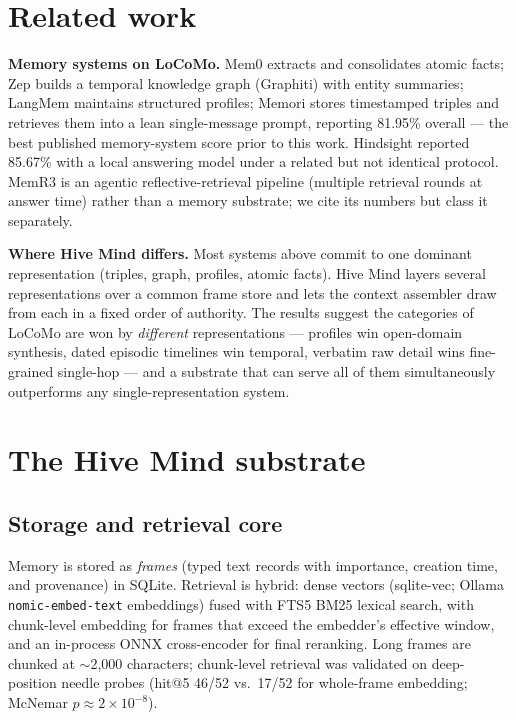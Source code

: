 \documentclass[11pt]{article}
\newcommand{\system}{Hive Mind}
\begin{document}
\section{Related work}

\textbf{Memory systems on LoCoMo.} Mem0 \cite{mem0} extracts and
consolidates atomic facts; Zep \cite{zep} builds a temporal knowledge
graph (Graphiti) with entity summaries; LangMem maintains structured
profiles; Memori \cite{memori} stores timestamped triples and
retrieves them into a lean single-message prompt, reporting 81.95\%
overall --- the best published memory-system score prior to this work.
Hindsight \cite{hindsight} reported 85.67\% with a local answering
model under a related but not identical protocol. MemR3 \cite{memr3}
is an agentic reflective-retrieval pipeline (multiple retrieval rounds
at answer time) rather than a memory substrate; we cite its numbers
but class it separately.

\textbf{Where \system{} differs.} Most systems above commit to one
dominant representation (triples, graph, profiles, atomic facts).
\system{} layers several representations over a common frame store and
lets the context assembler draw from each in a fixed order of
authority. The results suggest the categories of LoCoMo are won by
\emph{different} representations --- profiles win open-domain
synthesis, dated episodic timelines win temporal, verbatim raw detail
wins fine-grained single-hop --- and a substrate that can serve all of
them simultaneously outperforms any single-representation system.

\section{The \system{} substrate}
\label{sec:system}

\subsection{Storage and retrieval core}

Memory is stored as \emph{frames} (typed text records with importance,
creation time, and provenance) in SQLite. Retrieval is hybrid:
dense vectors (sqlite-vec; Ollama \texttt{nomic-embed-text}
embeddings) fused with FTS5 BM25 lexical search, with chunk-level
embedding for frames that exceed the embedder's effective window, and
an in-process ONNX cross-encoder for final reranking. Long frames are
chunked at $\sim$2{,}000 characters; chunk-level retrieval was
validated on deep-position needle probes (hit@5 46/52 vs.\ 17/52 for
whole-frame embedding; McNemar $p{\approx}2{\times}10^{-8}$).
\end{document}
